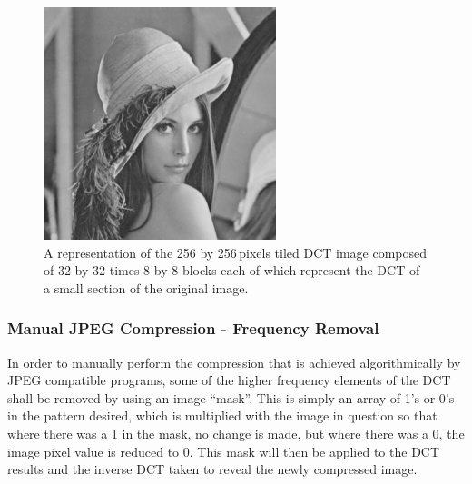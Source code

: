 \begin{figure}[ht]
\begin{minipage}[c]{0.45\linewidth}
			 	\includegraphics[width=\textwidth]{lena.jpg}
			\end{minipage}
			\caption{A representation of the 256 by 256\,pixels tiled DCT image composed of 32 by 32 times 8 by 8 blocks each of which represent the DCT of a small section of the original image.\label{fig:lena_DCT}}
		\end{figure}

	\subsubsection{Manual JPEG Compression - Frequency Removal} %
		\label{sub:manual_jpeg_compression_frequency_removal}
		In order to manually perform the compression that is achieved algorithmically by JPEG compatible programs, some of the higher frequency elements of the DCT shall be removed by using an image ``mask''. This is simply an array of 1's or 0's in the pattern desired, which is multiplied with the image in question so that where there was a 1 in the mask, no change is made, but where there was a 0, the image pixel value is reduced to 0. This mask will then be applied to the DCT results and the inverse DCT taken to reveal the newly compressed image.

